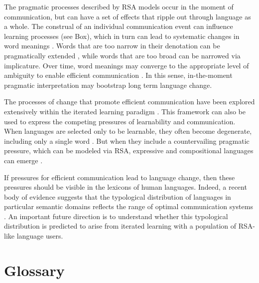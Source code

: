 \documentclass[]{elsarticle}
\begin{document}
The pragmatic processes described by RSA models occur in the moment of
communication, but can have a set of effects that ripple out through
language as a whole. The construal of an individual communication event
can influence learning processes (see Box), which in turn can lead to
systematic changes in word meanings \citep{smith2013}.
Words that are too narrow in their denotation can be pragmatically
extended \citep{kao2014}, while words that are too
broad can be narrowed via implicature. Over time, word meanings may
converge to the appropriate level of ambiguity to enable efficient
communication \citep{piantadosi2012}.
In this sense, in-the-moment pragmatic interpretation may bootstrap long term language change.

The processes of change that promote efficient communication have been
explored extensively within the iterated learning paradigm \citep{kirby2008}. 
This framework can also be used to express the competing pressures of
learnability and communication. When languages are selected only to be
learnable, they often become degenerate, including only a single word
\citep{perfors2014}. But when they include a countervailing
pragmatic pressure, which can be modeled via RSA, expressive and compositional languages can emerge
\citep{kirby2015}.

If pressures for efficient communication lead to language change, then
these pressures should be visible in the lexicons of human languages. Indeed, a
recent body of evidence suggests that the typological distribution of languages in particular
semantic domains reflects the range of optimal communication systems
\citep[e.g.,][]{regier2007,kemp2012,xu2014}.
An important future direction is to understand whether this typological distribution is predicted to arise from iterated learning with a population of RSA-like language users.


\section{Glossary}\label{glossary}
\end{document}
